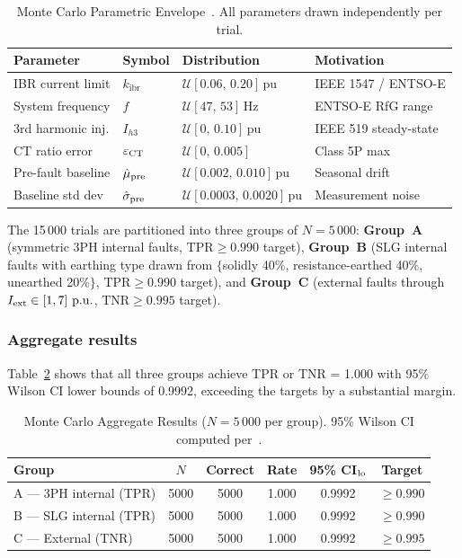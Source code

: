 \documentclass[journal,twoside,10pt]{IEEEtran}
\newcommand{\kibr}{k_{\mathrm{ibr}}}
\newcommand{\pu}{\,\text{p.u.}}
\begin{document}
\begin{table}[!t]
\centering
\caption{Monte Carlo Parametric Envelope~\cite{SAMBP_TR26}.
         All parameters drawn independently per trial.}
\label{tab:mc_params}
\renewcommand{\arraystretch}{1.05}
\begin{tabular}{llll}
\toprule
Parameter & Symbol & Distribution & Motivation \\
\midrule
IBR current limit & $\kibr$ & $\mathcal{U}[0.06,\,0.20]$\,pu
  & IEEE 1547 / ENTSO-E \\
System frequency & $f$ & $\mathcal{U}[47,\,53]$\,Hz
  & ENTSO-E RfG range \\
3rd harmonic inj. & $I_{h3}$ & $\mathcal{U}[0,\,0.10]$\,pu
  & IEEE 519 steady-state \\
CT ratio error & $\varepsilon_{\rm CT}$ & $\mathcal{U}[0,\,0.005]$
  & Class 5P max \\
Pre-fault baseline & $\hat{\mu}_{\rm pre}$ & $\mathcal{U}[0.002,\,0.010]$\,pu
  & Seasonal drift \\
Baseline std dev & $\hat{\sigma}_{\rm pre}$ & $\mathcal{U}[0.0003,\,0.0020]$\,pu
  & Measurement noise \\
\bottomrule
\end{tabular}
\end{table}

The 15\,000 trials are partitioned into three groups of $N = 5\,000$:
\textbf{Group~A} (symmetric 3PH internal faults, $\text{TPR} \geq 0.990$
target), \textbf{Group~B} (SLG internal faults with earthing type drawn
from $\{$solidly 40\%, resistance-earthed 40\%, unearthed 20\%$\}$,
$\text{TPR} \geq 0.990$ target), and \textbf{Group~C} (external faults
through $I_{\rm ext} \in [1,7]\,\pu$, $\text{TNR} \geq 0.995$ target).

\subsubsection{Aggregate results}

Table~\ref{tab:mc} shows that all three groups achieve TPR or TNR = 1.000
with 95\% Wilson CI lower bounds of 0.9992, exceeding the targets by a
substantial margin.

\begin{table}[!t]
\centering
\caption{Monte Carlo Aggregate Results ($N=5\,000$ per group).
         95\% Wilson CI computed per~\cite{Wilson1927}.}
\label{tab:mc}
\renewcommand{\arraystretch}{1.08}
\begin{tabular}{lccccc}
\toprule
Group & $N$ & Correct & Rate & 95\% CI$_{\rm lo}$ & Target \\
\midrule
A — 3PH internal (TPR)  & 5000 & 5000 & 1.000 & 0.9992 & $\geq 0.990$ \\
B — SLG internal (TPR)  & 5000 & 5000 & 1.000 & 0.9992 & $\geq 0.990$ \\
C — External (TNR)       & 5000 & 5000 & 1.000 & 0.9992 & $\geq 0.995$ \\
\bottomrule
\end{tabular}
\end{table}
\end{document}
